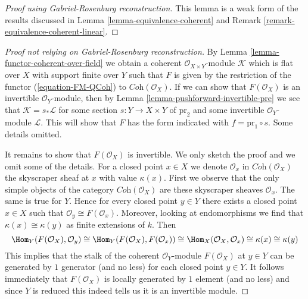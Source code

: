 \begin{proof}[Proof using Gabriel-Rosenburg reconstruction]
This lemma is a weak form of the results discussed in
Lemma \ref{lemma-equivalence-coherent} and
Remark \ref{remark-equivalence-coherent-linear}.
\end{proof}

\begin{proof}[Proof not relying on Gabriel-Rosenburg reconstruction]
By Lemma \ref{lemma-functor-coherent-over-field} we obtain a coherent
$\mathcal{O}_{X \times Y}$-module $\mathcal{K}$ which is flat
over $X$ with support finite over $Y$ such that $F$ is given by
the restriction of the functor
(\ref{equation-FM-QCoh}) to $\textit{Coh}(\mathcal{O}_X)$.
If we can show that $F(\mathcal{O}_X)$ is an invertible $\mathcal{O}_Y$-module,
then by Lemma \ref{lemma-pushforward-invertible-pre}
we see that $\mathcal{K} = s_*\mathcal{L}$
for some section $s : Y \to X \times Y$ of $\text{pr}_2$ and some
invertible $\mathcal{O}_Y$-module $\mathcal{L}$.
This will show that $F$ has the form indicated with
$f = \text{pr}_1 \circ s$. Some details omitted.

\medskip\noindent
It remains to show that $F(\mathcal{O}_X)$ is invertible. We only
sketch the proof and we omit some of the details.
For a closed point $x \in X$ we denote
$\mathcal{O}_x$ in $\textit{Coh}(\mathcal{O}_X)$
the skyscraper sheaf at $x$ with value $\kappa(x)$.
First we observe that the only simple objects
of the category $\textit{Coh}(\mathcal{O}_X)$
are these skyscraper sheaves $\mathcal{O}_x$.
The same is true for $Y$. Hence for every closed point $y \in Y$
there exists a closed point $x \in X$ such that
$\mathcal{O}_y \cong F(\mathcal{O}_x)$. Moreover, looking at endomorphisms
we find that $\kappa(x) \cong \kappa(y)$ as finite extensions of $k$.
Then
$$
\Hom_Y(F(\mathcal{O}_X), \mathcal{O}_y) \cong
\Hom_Y(F(\mathcal{O}_X), F(\mathcal{O}_x)) \cong
\Hom_X(\mathcal{O}_X, \mathcal{O}_x) \cong \kappa(x) \cong \kappa(y)
$$
This implies that the stalk of the coherent $\mathcal{O}_Y$-module
$F(\mathcal{O}_X)$ at $y \in Y$ can be generated by $1$ generator
(and no less) for each closed point $y \in Y$. It follows immediately
that $F(\mathcal{O}_X)$ is locally generated by $1$ element (and no less)
and since $Y$ is reduced this indeed tells us it is an invertible module.
\end{proof}
















